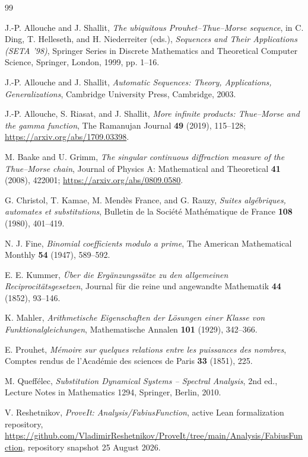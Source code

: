 \documentclass[11pt,oneside]{article}
\theoremstyle{definition}
\theoremstyle{remark}
\newcommand{\1}{\mathbf 1}
\begin{document}
\begin{thebibliography}{99}

J.-P. Allouche and J. Shallit,
\emph{The ubiquitous Prouhet--Thue--Morse sequence},
in C. Ding, T. Helleseth, and H. Niederreiter (eds.),
\emph{Sequences and Their Applications (SETA '98)},
Springer Series in Discrete Mathematics and Theoretical Computer Science,
Springer, London, 1999, pp. 1--16.

J.-P. Allouche and J. Shallit,
\emph{Automatic Sequences: Theory, Applications, Generalizations},
Cambridge University Press, Cambridge, 2003.

J.-P. Allouche, S. Riasat, and J. Shallit,
\emph{More infinite products: Thue--Morse and the gamma function},
The Ramanujan Journal \textbf{49} (2019), 115--128;
\url{https://arxiv.org/abs/1709.03398}.

M. Baake and U. Grimm,
\emph{The singular continuous diffraction measure of the Thue--Morse chain},
Journal of Physics A: Mathematical and Theoretical \textbf{41} (2008), 422001;
\url{https://arxiv.org/abs/0809.0580}.

G. Christol, T. Kamae, M. Mend\`es France, and G. Rauzy,
\emph{Suites alg\'ebriques, automates et substitutions},
Bulletin de la Soci\'et\'e Math\'ematique de France \textbf{108} (1980), 401--419.

N. J. Fine,
\emph{Binomial coefficients modulo a prime},
The American Mathematical Monthly \textbf{54} (1947), 589--592.

E. E. Kummer,
\emph{\"Uber die Erg\"anzungss\"atze zu den allgemeinen Reciprocit\"atsgesetzen},
Journal f\"ur die reine und angewandte Mathematik \textbf{44} (1852), 93--146.

K. Mahler,
\emph{Arithmetische Eigenschaften der L\"osungen einer Klasse von Funktionalgleichungen},
Mathematische Annalen \textbf{101} (1929), 342--366.

E. Prouhet,
\emph{M\'emoire sur quelques relations entre les puissances des nombres},
Comptes rendus de l'Acad\'emie des sciences de Paris \textbf{33} (1851), 225.

M. Queff\'elec,
\emph{Substitution Dynamical Systems -- Spectral Analysis},
2nd ed., Lecture Notes in Mathematics 1294, Springer, Berlin, 2010.

V. Reshetnikov,
\emph{ProveIt: Analysis/FabiusFunction}, active Lean formalization repository,
\url{https://github.com/VladimirReshetnikov/ProveIt/tree/main/Analysis/FabiusFunction},
repository snapshot 25 August 2026.


\end{thebibliography}
\end{document}
